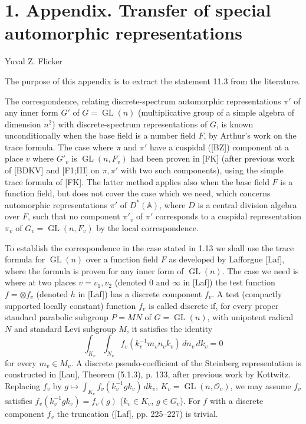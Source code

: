 \documentclass[10pt]{article}
\newcommand{\Adele}{\mathbb A}
\newcommand{\GL}{\operatorname{GL}}
\newcommand{\OO}{\mathcal O}
\theoremstyle{deligne}
\begin{document}
\section*{1. Appendix. Transfer of special automorphic representations}
\begin{center}Yuval Z. Flicker\end{center}

The purpose of this appendix is to extract the statement 11.3 from the literature.

The correspondence, relating discrete-spectrum automorphic representations $\pi'$ of any inner form $G'$ of $G=\GL(n)$ (multiplicative group of a simple algebra of dimension $n^2$) with discrete-spectrum representations of $G$, is known unconditionally when the base field is a number field $F$, by Arthur's work on the trace formula. The case where $\pi$ and $\pi'$ have a cuspidal ([BZ]) component at a place $v$ where $G'_v$ is $\GL(n,F_v)$ had been proven in [FK] (after previous work of [BDKV] and [F1;III] on $\pi,\pi'$ with two such components), using the simple trace formula of [FK]. The latter method applies also when the base field $F$ is a function field, but does not cover the case which we need, which concerns automorphic representations $\pi'$ of $D^*(\Adele)$, where $D$ is a central division algebra over $F$, such that no component $\pi'_v$ of $\pi'$ corresponds to a cuspidal representation $\pi_v$ of $G_v=\GL(n,F_v)$ by the local correspondence.

To establish the correspondence in the case stated in 1.13 we shall use the trace formula for $\GL(n)$ over a function field $F$ as developed by Lafforgue [Laf], where the formula is proven for any inner form of $\GL(n)$. The case we need is where at two places $v=v_1,v_2$ (denoted $0$ and $\infty$ in [Laf]) the test function $f=\otimes f_v$ (denoted $h$ in [Laf]) has a discrete component $f_v$. A test (compactly supported locally constant) function $f_v$ is called discrete if, for every proper standard parabolic subgroup $P=MN$ of $G=\GL(n)$, with unipotent radical $N$ and standard Levi subgroup $M$, it satisfies the identity
\[
\int_{K_v}\int_{N_v} f_v(k_v^{-1}m_vn_vk_v)\,dn_v\,dk_v=0
\]
for every $m_v\in M_v$. A discrete pseudo-coefficient of the Steinberg representation is constructed in [Lau], Theorem (5.1.3), p. 133, after previous work by Kottwitz. Replacing $f_v$ by $g\mapsto\int_{K_v}f_v(k_v^{-1}gk_v)\,dk_v$, $K_v=\GL(n,\OO_v)$, we may assume $f_v$ satisfies $f_v(k_v^{-1}gk_v)=f_v(g)$ ($k_v\in K_v$, $g\in G_v$). For $f$ with a discrete component $f_v$ the truncation ([Laf], pp. 225--227) is trivial.
\end{document}
